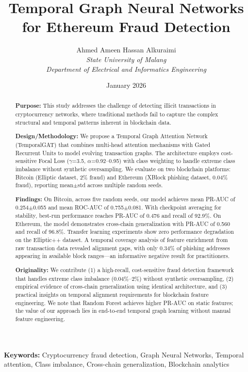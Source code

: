 \documentclass[12pt,a4paper]{article}
\title{Temporal Graph Neural Networks for Ethereum Fraud Detection}
\author{Ahmed Ameen Hassan Alkuraimi\\
\textit{State University of Malang}\\
\textit{Department of Electrical and Informatics Engineering}}
\date{January 2026}
\begin{document}
\maketitle

\begin{abstract}
\textbf{Purpose:} This study addresses the challenge of detecting illicit transactions in cryptocurrency networks, where traditional methods fail to capture the complex structural and temporal patterns inherent in blockchain data.

\textbf{Design/Methodology:} We propose a Temporal Graph Attention Network (TemporalGAT) that combines multi-head attention mechanisms with Gated Recurrent Units to model evolving transaction graphs. The architecture employs cost-sensitive Focal Loss ($\gamma$=3.5, $\alpha$=0.92--0.95) with class weighting to handle extreme class imbalance without synthetic oversampling. We evaluate on two blockchain platforms: Bitcoin (Elliptic dataset, 2\% fraud) and Ethereum (XBlock phishing dataset, 0.04\% fraud), reporting mean$\pm$std across multiple random seeds.

\textbf{Findings:} On Bitcoin, across five random seeds, our model achieves mean PR-AUC of 0.254$\pm$0.055 and mean ROC-AUC of 0.755$\pm$0.081. With checkpoint averaging for stability, best-run performance reaches PR-AUC of 0.476 and recall of 92.9\%. On Ethereum, the model demonstrates cross-chain generalization with PR-AUC of 0.560 and recall of 96.8\%. Transfer learning experiments show zero performance degradation on the Elliptic++ dataset. A temporal coverage analysis of feature enrichment from raw transaction data revealed alignment gaps, with only 0.34\% of phishing addresses appearing in available block ranges---an informative negative result for practitioners.

\textbf{Originality:} We contribute (1) a high-recall, cost-sensitive fraud detection framework that handles extreme class imbalance (0.04\%--2\%) without synthetic oversampling, (2) empirical evidence of cross-chain generalization using identical architecture, and (3) practical insights on temporal alignment requirements for blockchain feature engineering. We note that Random Forest achieves higher PR-AUC on static features; the value of our approach lies in end-to-end temporal graph learning without manual feature engineering.
\end{abstract}

\textbf{Keywords:} Cryptocurrency fraud detection, Graph Neural Networks, Temporal attention, Class imbalance, Cross-chain generalization, Blockchain analytics
\end{document}
